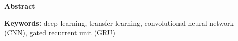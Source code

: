 \thispagestyle{plain}
\begin{center}
    \textbf{\LARGE{Abstract}}
\end{center}
\lipsum[1]     

\textbf{Keywords:} deep learning, transfer learning, convolutional neural network (CNN), gated recurrent unit (GRU)    